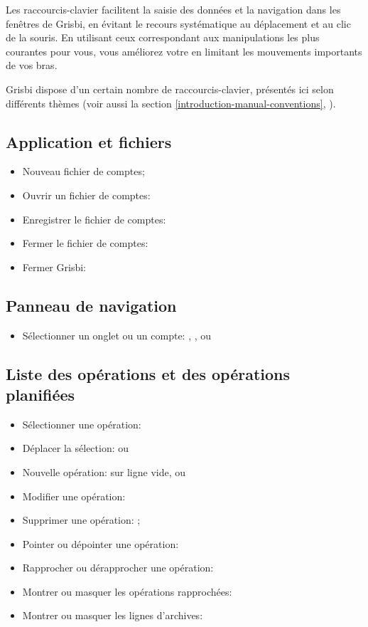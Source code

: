 Les raccourcis-clavier facilitent la saisie des données et la navigation dans les fenêtres de Grisbi, en évitant le recours systématique au déplacement et au clic de la souris. En utilisant ceux correspondant aux manipulations les plus courantes pour vous, vous améliorez votre  en limitant les mouvements importants de vos bras.
 
Grisbi dispose d'un certain nombre de raccourcis-clavier, présentés ici selon différents thèmes (voir aussi la section \vref{introduction-manual-conventions}, ).


\subsection{Application et fichiers}

\begin{itemize}
	\item Nouveau fichier de comptes; 
	\item Ouvrir un fichier de comptes: 
	\item Enregistrer le fichier de comptes: 
	\item Fermer le fichier de comptes: 
	\item Fermer Grisbi: 
\end{itemize}


\subsection{Panneau de navigation}

\begin{itemize}
	\item Sélectionner un onglet ou un compte: , ,  ou 
\end{itemize}


\subsection{Liste des opérations et des opérations planifiées}

\begin{itemize}
	\item Sélectionner une opération: 
	\item Déplacer la sélection:  ou 
	\item Nouvelle opération:  sur ligne vide, ou 
	\item Modifier une opération: 
	\item Supprimer une opération: ;
	\item Pointer ou dépointer une opération: 
	\item Rapprocher ou dérapprocher une opération: 
	\item Montrer ou masquer les opérations rapprochées: 
	\item Montrer ou masquer les lignes d'archives: 
\end{itemize}


